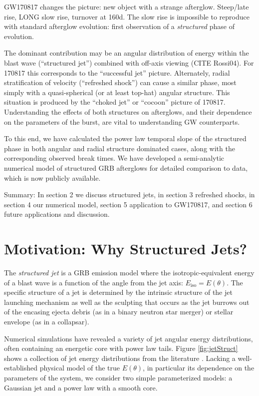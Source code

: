 \documentclass[twocolumn]{aastex62}
\newcommand{\Eiso}{\ensuremath{E_{\mathrm{iso}}}}
\begin{document}
GW170817 changes the picture: new object with a strange afterglow.  Steep/late rise, LONG slow rise, turnover at 160d.  The slow rise is impossible to reproduce with standard afterglow evolution: first observation of a \emph{structured} phase of evolution. 

The dominant contribution may be an angular distribution of energy within the blast wave (``structured jet'') combined with off-axis viewing (CITE Rossi04).  For 170817 this corresponds to the ``successful jet'' picture.  Alternately, radial stratification of velocity (``refreshed shock'') can cause a similar phase, most simply with a quasi-spherical (or at least top-hat) angular structure.  This situation is produced by the ``choked jet''  or ``cocoon'' picture of 170817. Understanding the effects of both structures on afterglows, and their dependence on the parameters of the burst, are vital to understanding GW counterparts.

To this end, we have calculated the power law temporal slope of the structured phase in both angular and radial structure dominated cases, along with the corresponding observed break times.  We have developed a semi-analytic numerical model of structured GRB afterglows for detailed comparison to data, which is now publicly available.

Summary: In section 2 we discuss structured jets, in section 3 refreshed shocks, in section 4 our numerical model, section 5 application to GW170817, and section 6 future applications and discussion.

\section{Motivation: Why Structured Jets?}\label{sec:motivation}

The \emph{structured jet} is a GRB emission model where the isotropic-equivalent energy of a blast wave is a function of the angle from the jet axis: $\Eiso = E(\theta)$. The specific structure of a jet is determined by the intrinsic structure of the jet launching mechanism as well as the sculpting that occurs as the jet burrows out of the encasing ejecta debris (as in a binary neutron star merger) or stellar envelope (as in a collapsar).  

Numerical simulations have revealed a variety of jet angular energy distributions, often containing an energetic core with power law tails.  Figure \ref{fig:jetStruct} shows a collection of jet energy distributions from the literature \citep{Aloy:2005aa, Mizuta:2009aa, Duffell:2013aa, Lazzati:2017aa, Margutti:2018aa}.  Lacking a well-established physical model of the true $E(\theta)$, in particular its dependence on the parameters of the system, we consider two simple parameterized models: a Gaussian jet and a power law with a smooth core.  
\end{document}
